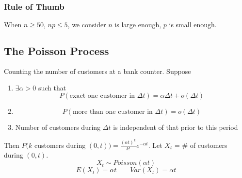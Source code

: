 \subsubsection{Rule of Thumb}
When $n \geq 50$, $np \leq 5$, we consider $n$ is large enough, $p$ is small enough.

\subsection{The Poisson Process}
\begin{exmp}
Counting the number of customers at a bank counter. Suppose
\begin{enumerate}
\item $\exists \alpha > 0$ such that
\[P(\text{exact one customer in } \Delta t)=\alpha \Delta t +o(\Delta t)\]
\item \[P(\text{more than one customer in } \Delta t)=o(\Delta t)\]
\item Number of customers during $\Delta t$ is independent of that prior to this period
\end{enumerate}

Then $P(k$ customers during $(0,t))=\frac{(\alpha t)^k}{k!}e^{-\alpha t}$.
Let $X_t$ = \# of customers during $(0,t)$.
\[X_t \sim Poisson(\alpha t)\]
\[E(X_t)=\alpha t \qquad Var(X_t)=\alpha t\]
\end{exmp}